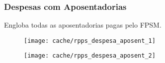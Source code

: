 
\subsubsection{Despesas com Aposentadorias}

Engloba todas as aposentadorias pagas pelo FPSM.





\begin{figure}[H]
\center
\texttt{[image: cache/rpps\_despesa\_aposent\_1]}
\end{figure}

\begin{figure}[H]
\center
\texttt{[image: cache/rpps\_despesa\_aposent\_2]}
\end{figure}

